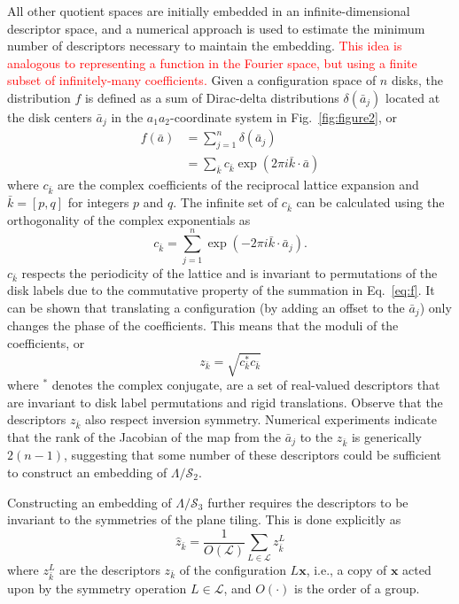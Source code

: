 \documentclass[default,iicol]{sn-jnl}%
\theoremstyle{thmstyleone}%
\theoremstyle{thmstyletwo}%
\theoremstyle{thmstylethree}%
\renewcommand{\vec}[1]{\bar{#1}}
\providecommand{\config}[1]{\mathbf{#1}}
\providecommand{\rmi}{i}
\providecommand{\red}[1]{\textcolor{red}{#1}}
\begin{document}
All other quotient spaces are initially embedded in an infinite-dimensional descriptor space, and a numerical approach is used to estimate the minimum number of descriptors necessary to maintain the embedding. \red{This idea is analogous to representing a function in the Fourier space, but using a finite subset of infinitely-many coefficients.} Given a configuration space of $n$ disks, the distribution $f$ is defined as a sum of Dirac-delta distributions $\delta(\vec{a}_j)$ located at the disk centers $\vec{a}_j$ in the $a_1a_2$-coordinate system in Fig.\ \ref{fig:figure2}, or
\begin{subequations}
	\begin{align}
	f(\vec{a}) 	&= \sum_{j = 1}^{n} \delta(\vec{a}_j) \\ 
				&= \sum_{\vec{k}} {c_{\vec{k}} \exp{(2\pi \rmi \vec{k} \cdot \vec{a})}}
	\label{eq:f}
	\end{align}
\end{subequations}
where $c_{\vec{k}}$ are the complex coefficients of the reciprocal lattice expansion and $\vec{k} = [p, q]$ for integers $p$ and $q$. The infinite set of $c_{\vec{k}}$ can be calculated using the orthogonality of the complex exponentials as
\begin{equation}
c_{\vec{k}} = \sum_{j=1}^{n} \exp{(-2\pi \rmi \vec{k} \cdot \vec{a}_j)} .
\label{eq:c_k}
\end{equation}
$c_{\vec{k}}$ respects the periodicity of the lattice and is invariant to permutations of the disk labels due to the commutative property of the summation in Eq.\ \ref{eq:f}. It can be shown that translating a configuration (by adding an offset to the $\vec{a}_j$) only changes the phase of the coefficients. This means that the moduli of the coefficients, or
\begin{equation}
z_{\vec{k}} = \sqrt{c^\ast_{\vec{k}} c_{\vec{k}}}
\label{eq:z_k}
\end{equation}
where $^\ast$ denotes the complex conjugate, are a set of real-valued descriptors that are invariant to disk label permutations and rigid translations. Observe that the descriptors $z_{\vec{k}}$ also respect inversion symmetry. Numerical experiments indicate that the rank of the Jacobian of the map from the $\vec{a}_j$ to the $z_{\vec{k}}$ is generically $2(n - 1)$, suggesting that some number of these descriptors could be sufficient to construct an embedding of $\Lambda / \mathcal{S}_2$.

Constructing an embedding of $\Lambda / \mathcal{S}_3$ further requires the descriptors to be invariant to the symmetries of the plane tiling. This is done explicitly as
\begin{equation}
\hat{z}_{\vec{k}} = \frac{1}{O(\mathcal{L})}\sum_{L \in \mathcal{L}} z_{\vec{k}}^{L}
\label{eq:z_hat_k}
\end{equation}
where $z_{\vec{k}}^{L}$ are the descriptors $z_{\vec{k}}$ of the configuration $L \config{x}$, i.e., a copy of $\config{x}$ acted upon by the symmetry operation $L \in \mathcal{L}$, and $O(\cdot)$ is the order of a group.
\end{document}
